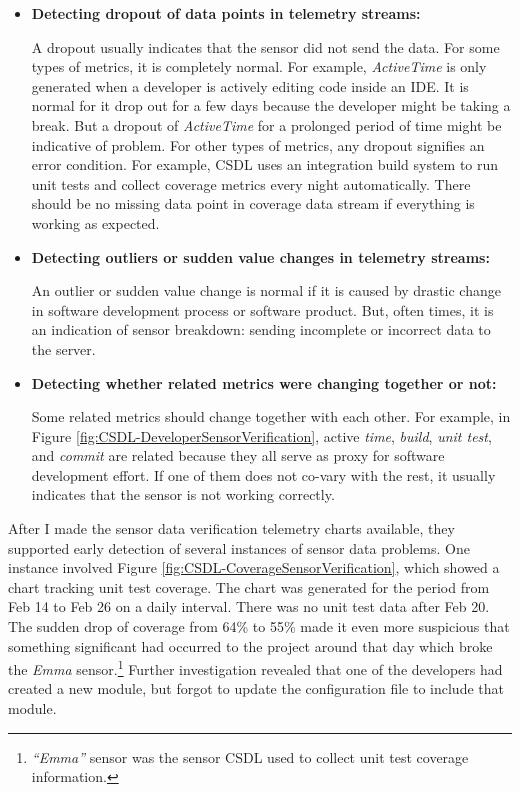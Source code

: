 \begin{itemize}
	\item \textbf{Detecting dropout of data points in telemetry streams:}

A dropout usually indicates that the sensor did not send the data. For some types of metrics, it is completely normal. For example, \textit{ActiveTime} is only generated when a developer is actively editing code inside an IDE. It is normal for it drop out for a few days because the developer might be taking a break. But a dropout of \textit{ActiveTime} for a prolonged period of time might be indicative of problem. For other types of metrics, any dropout signifies an error condition. For example, CSDL uses an integration build system to run unit tests and collect coverage metrics every night automatically. There should be no missing data point in coverage data stream if everything is working as expected.

	\item \textbf{Detecting outliers or sudden value changes in telemetry streams:}
	
An outlier or sudden value change is normal if it is caused by drastic change in software development process or software product. But, often times, it is an indication of sensor breakdown: sending incomplete or incorrect data to the server.

	\item \textbf{Detecting whether related metrics were changing together or not:}

Some related metrics should change together with each other. For example, in Figure	\ref{fig:CSDL-DeveloperSensorVerification}, active \textit{time}, \textit{build}, \textit{unit test}, and \textit{commit} are related because they all serve as proxy for software development effort. If one of them does not co-vary with the rest, it usually indicates that the sensor is not working correctly.
	
\end{itemize}

After I made the sensor data verification telemetry charts available, they supported early detection of several instances of sensor data problems. 
One instance involved Figure \ref{fig:CSDL-CoverageSensorVerification}, which showed a chart tracking unit test coverage. The chart was generated for the period from Feb 14 to Feb 26 on a daily interval. There was no unit test data after Feb 20. The sudden drop of coverage from 64\% to 55\% made it even more suspicious that something significant had occurred to the project around that day which broke the \textit{Emma} sensor.\footnote{\textit{``Emma''} sensor was the sensor CSDL used to collect unit test coverage information.} Further investigation revealed that one of the developers had created a new module, but forgot to update the configuration file to include that  module.

